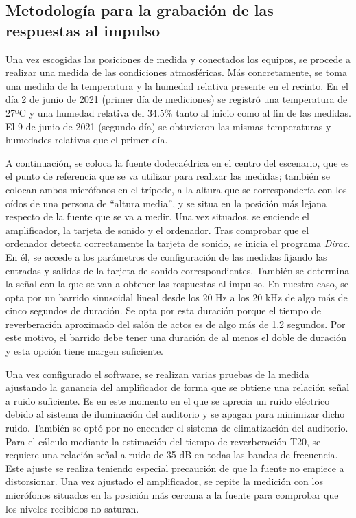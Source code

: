 \documentclass[11pt,a4paper,twoside]{book}
\begin{document}
        \subsection{Metodología para la grabación de las respuestas al impulso}
            Una vez escogidas las posiciones de medida y conectados los equipos, se procede a realizar una medida de las condiciones atmosféricas. Más concretamente, se toma una medida de la temperatura y la humedad relativa presente en el recinto. En el día 2 de junio de 2021 (primer día de mediciones) se registró una temperatura de 27ºC y una humedad relativa del 34.5\% tanto al inicio como al fin de las medidas. El 9 de junio de 2021 (segundo día) se obtuvieron las mismas temperaturas y humedades relativas que el primer día.
        
            A continuación, se coloca la fuente dodecaédrica en el centro del escenario, que es el punto de referencia que se va utilizar para realizar las medidas; también se colocan ambos micrófonos en el trípode, a la altura que se correspondería con los oídos de una persona de ``altura media'', y se situa en la posición más lejana respecto de la fuente que se va a medir. Una vez situados, se enciende el amplificador, la tarjeta de sonido y el ordenador. Tras comprobar que el ordenador detecta correctamente la tarjeta de sonido, se inicia el programa \textit{Dirac}. En él, se accede a los parámetros de configuración de las medidas fijando las entradas y salidas de la tarjeta de sonido correspondientes. También se determina la señal con la que se van a obtener las respuestas al impulso. En nuestro caso, se opta por un barrido sinusoidal lineal desde los 20 Hz a los 20 kHz de algo más de cinco segundos de duración. Se opta por esta duración porque el tiempo de reverberación aproximado del salón de actos es de algo más de 1.2 segundos. Por este motivo, el barrido debe tener una duración de al menos el doble de duración y esta opción tiene margen suficiente.
        
            Una vez configurado el software, se realizan varias pruebas de la medida ajustando la ganancia del amplificador de forma que se obtiene una relación señal a ruido suficiente. Es en este momento en el que se aprecia un ruido eléctrico debido al sistema de iluminación del auditorio y se apagan para minimizar dicho ruido. También se optó por no encender el sistema de climatización del auditorio. Para el cálculo mediante la estimación del tiempo de reverberación T20, se requiere una relación señal a ruido de 35 dB en todas las bandas de frecuencia. Este ajuste se realiza teniendo especial precaución de que la fuente no empiece a distorsionar. Una vez ajustado el amplificador, se repite la medición con los micrófonos situados en la posición más cercana a la fuente para comprobar que los niveles recibidos no saturan.
        
\end{document}
